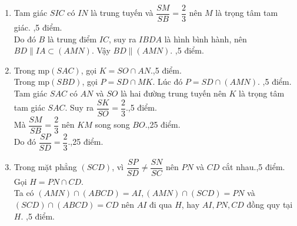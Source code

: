 \begin{ex}
{\begin{enumerate}
			\item Tam giác $SIC$ có $IN$ là trung tuyến và $\dfrac{SM}{SB}=\dfrac{2}{3}$ nên $M$ là trọng tâm tam giác. ,5 điểm.\\
			Do đó $B$ là trung điểm $IC$, suy ra $IBDA$ là hình bình hành, nên $BD\parallel IA\subset (AMN)$. Vậy $BD\parallel (AMN)$. ,5 điểm.
			\item Trong mp$(SAC)$, gọi $K=SO\cap AN$.,5 điểm.\\
			Trong mp$(SBD)$, gọi $P=SD\cap MK$. Lúc đó $P=SD\cap (AMN)$. ,5 điểm.\\
			Tam giác $SAC$ có $AN$ và $SO$ là hai đường trung tuyến nên $K$ là trọng tâm tam giác $SAC$. Suy ra $\dfrac{SK}{SO}=\dfrac{2}{3}$.,5 điểm.\\
			Mà $\dfrac{SM}{SB}=\dfrac{2}{3}$ nên $KM$ song song $BO$.,25 điểm.\\
			Do đó $\dfrac{SP}{SD}=\dfrac{2}{3}$.,25 điểm.
			\item Trong mặt phẳng $(SCD)$, vì $\dfrac{SP}{SD}\neq \dfrac{SN}{SC}$ nên $PN$ và $CD$ cắt nhau.,5 điểm.\\
			Gọi $H=PN\cap CD$.\\
			Ta có $(AMN)\cap (ABCD)=AI, (AMN)\cap (SCD)=PN$ và $(SCD) \cap (ABCD)=CD$ nên $AI$ đi qua $H$, hay $AI, PN, CD$ đồng quy tại $H$. ,5 điểm.
		\end{enumerate}
	}
\end{ex}

